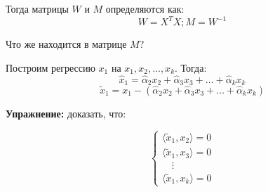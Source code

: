 \documentclass[12pt]{article} %
\theoremstyle{definition} %
\begin{document}
Тогда матрицы $W$ и $M$ определяются как: $$W = X^TX; M = W^{-1}$$ 

Что же находится в матрице $M$?

Построим регрессию $x_1$ на $x_1, x_2, \ldots, x_k$. Тогда: 
\[
\hat x_1 = \hat \alpha_2 x_2 + \hat \alpha_3 x_3 + \ldots + \hat \alpha_k x_k
\]
\[
\tilde x_1 = x_1 - \left(\hat \alpha_2 x_2 + \hat \alpha_3 x_3 + \ldots + \hat \alpha_k x_k \right)
\]



\textbf{Упражнение:} доказать, что:

  \begin{equation*}
     \begin{cases}
       \langle \tilde x_1, x_2 \rangle = 0 \\
       \langle \tilde x_1, x_3 \rangle = 0 \\
       \quad\vdots \\
       \langle \tilde x_1, x_k \rangle = 0
    \end{cases}
  \end{equation*}
\end{document}
